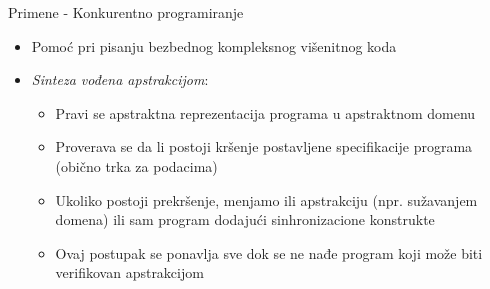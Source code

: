 \begin{frame}{Primene - Konkurentno programiranje}
    \begin{itemize}
        \item Pomoć pri pisanju bezbednog kompleksnog višenitnog koda
        \item \emph{Sinteza vođena apstrakcijom}:
        \begin{itemize}
            \item Pravi se apstraktna reprezentacija programa u apstraktnom domenu
            \item Proverava se da li postoji kršenje postavljene specifikacije programa (obično trka za podacima)
            \item Ukoliko postoji prekršenje, menjamo ili apstrakciju (npr. sužavanjem domena) ili sam program dodajući sinhronizacione konstrukte
            \item Ovaj postupak se ponavlja sve dok se ne nađe program koji može biti verifikovan apstrakcijom
        \end{itemize}
    \end{itemize}
\end{frame}

\fi

